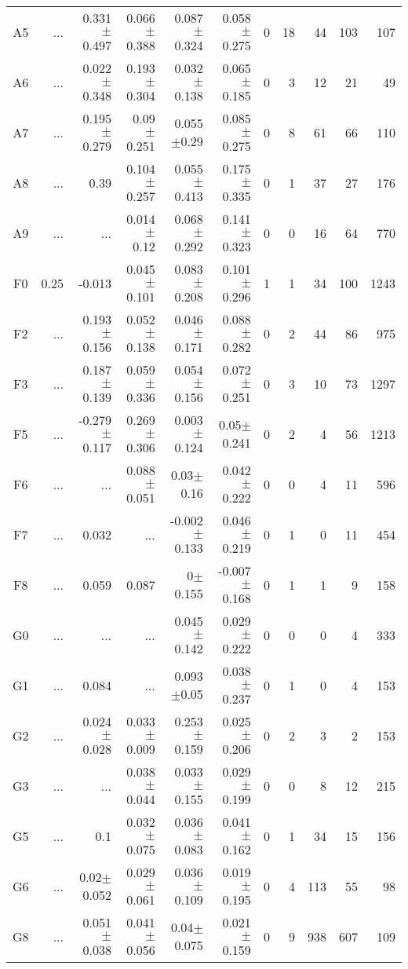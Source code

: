\begin{table}[t]
\begin{center}
\begin{tabular}{c|rrrrr|rrrrr}
A5	&	 ...	&	0.331$\pm$0.497	&	0.066$\pm$0.388	&	0.087$\pm$0.324	&	0.058$\pm$0.275	&	0	&	18	&	44	&	103	&	107	\\
A6	&	 ...	&	0.022$\pm$0.348	&	0.193$\pm$0.304	&	0.032$\pm$0.138	&	0.065$\pm$0.185	&	0	&	3	&	12	&	21	&	49	\\
A7	&	 ...	&	0.195$\pm$0.279	&	0.09$\pm$0.251	&	0.055$\pm$0.29	&	0.085$\pm$0.275	&	0	&	8	&	61	&	66	&	110	\\
A8	&	 ...	&	0.39	&	0.104$\pm$0.257	&	0.055$\pm$0.413	&	0.175$\pm$0.335	&	0	&	1	&	37	&	27	&	176	\\
A9	&	 ...	&	 ...	&	0.014$\pm$0.12	&	0.068$\pm$0.292	&	0.141$\pm$0.323	&	0	&	0	&	16	&	64	&	770	\\
F0	&	0.25	&	-0.013	&	0.045$\pm$0.101	&	0.083$\pm$0.208	&	0.101$\pm$0.296	&	1	&	1	&	34	&	100	&	1243	\\
F2	&	 ...	&	0.193$\pm$0.156	&	0.052$\pm$0.138	&	0.046$\pm$0.171	&	0.088$\pm$0.282	&	0	&	2	&	44	&	86	&	975	\\
F3	&	 ...	&	0.187$\pm$0.139	&	0.059$\pm$0.336	&	0.054$\pm$0.156	&	0.072$\pm$0.251	&	0	&	3	&	10	&	73	&	1297	\\
F5	&	 ...	&	-0.279$\pm$0.117	&	0.269$\pm$0.306	&	0.003$\pm$0.124	&	0.05$\pm$0.241	&	0	&	2	&	4	&	56	&	1213	\\
F6	&	 ...	&	 ...	&	0.088$\pm$0.051	&	0.03$\pm$0.16	&	0.042$\pm$0.222	&	0	&	0	&	4	&	11	&	596	\\
F7	&	 ...	&	0.032	&	 ...	&	-0.002$\pm$0.133	&	0.046$\pm$0.219	&	0	&	1	&	0	&	11	&	454	\\
F8	&	 ...	&	0.059	&	0.087	&	0$\pm$0.155	&	-0.007$\pm$0.168	&	0	&	1	&	1	&	9	&	158	\\
G0	&	 ...	&	 ...	&	 ...	&	0.045$\pm$0.142	&	0.029$\pm$0.222	&	0	&	0	&	0	&	4	&	333	\\
G1	&	 ...	&	0.084	&	 ...	&	0.093$\pm$0.05	&	0.038$\pm$0.237	&	0	&	1	&	0	&	4	&	153	\\
G2	&	 ...	&	0.024$\pm$0.028	&	0.033$\pm$0.009	&	0.253$\pm$0.159	&	0.025$\pm$0.206	&	0	&	2	&	3	&	2	&	153	\\
G3	&	 ...	&	 ...	&	0.038$\pm$0.044	&	0.033$\pm$0.155	&	0.029$\pm$0.199	&	0	&	0	&	8	&	12	&	215	\\
G5	&	 ...	&	0.1	&	0.032$\pm$0.075	&	0.036$\pm$0.083	&	0.041$\pm$0.162	&	0	&	1	&	34	&	15	&	156	\\
G6	&	 ...	&	0.02$\pm$0.052	&	0.029$\pm$0.061	&	0.036$\pm$0.109	&	0.019$\pm$0.195	&	0	&	4	&	113	&	55	&	98	\\
G8	&	 ...	&	0.051$\pm$0.038	&	0.041$\pm$0.056	&	0.04$\pm$0.075	&	0.021$\pm$0.159	&	0	&	9	&	938	&	607	&	109	\\

\end{tabular}
\end{center}
\end{table}
